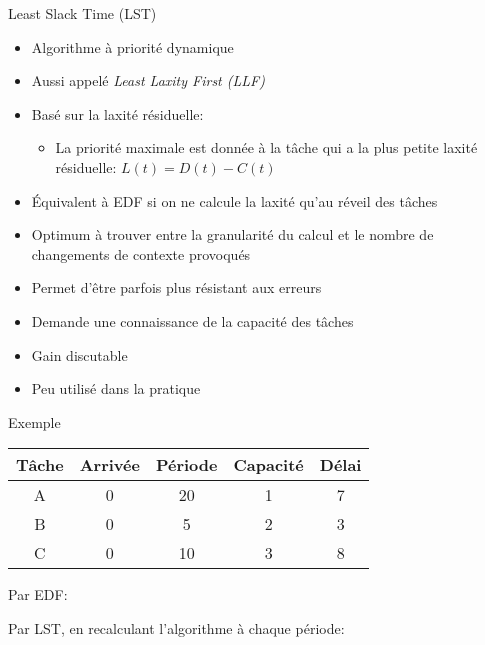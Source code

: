 \begin{frame}{Least Slack Time (LST)}
  \begin{itemize}
  \item Algorithme à priorité dynamique
  \item Aussi appelé \emph{Least Laxity First (LLF)}
  \item Basé sur la laxité résiduelle:
    \begin{itemize}
    \item La  priorité maximale est  donnée à la  tâche qui a  la plus
      petite laxité résiduelle: $L(t) = D(t) - C(t)$
    \end{itemize}
  \item Équivalent à  EDF si on ne calcule la  laxité qu'au réveil des
    tâches
  \item Optimum à trouver entre  la granularité du calcul et le nombre
    de changements de  contexte provoqués
  \item Permet d'être parfois plus résistant aux erreurs
  \item Demande une connaissance de la capacité des tâches
  \item Gain discutable
  \item Peu utilisé dans la pratique
  \end{itemize}
\end{frame}

\begin{frame}{Exemple}
  \begin{center}
    \begin{tabular}{ccccc}
      \hline
      Tâche & Arrivée & Période & Capacité & Délai \\
      \hline
      A & 0 & 20 & 1 & 7\\
      B & 0 &  5 & 2 & 3\\
      C & 0 & 10 & 3 & 8\\
      \hline
    \end{tabular}
  \end{center}
  \begin{overprint}

    Par EDF:
    \begin{center}
      
    \end{center}

    Par LST, en recalculant l'algorithme à chaque période:
    \begin{center}
      
    \end{center}
  \end{overprint}
\end{frame}

